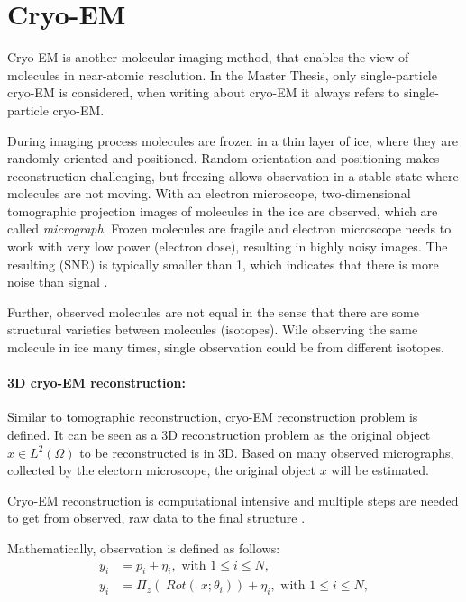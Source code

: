 \section{Cryo-EM}
Cryo-EM is another molecular imaging method, that enables the view of molecules in near-atomic resolution.
In the Master Thesis, only single-particle cryo-EM \cite{singleParticleCryoEm} is considered, 
when writing about cryo-EM it always refers to single-particle cryo-EM.

During imaging process molecules are frozen in a thin layer of ice, where they are randomly oriented and positioned. 
Random orientation and positioning makes reconstruction challenging, 
but freezing allows observation in a stable state where molecules are not moving.
With an electron microscope, two-dimensional tomographic projection images of molecules in the ice are observed,
which are called \textit{micrograph}. 
Frozen molecules are fragile and electron microscope needs to work with
very low power (electron dose), resulting in highly noisy images. The resulting (SNR)
is typically smaller than 1, which indicates that there is more noise than signal \cite{cryoEmMath2}.

Further, observed molecules are not equal in the sense that there are some structural varieties between
molecules (isotopes). Wile observing the same molecule in ice many times, single observation could be from different isotopes.

\paragraph{3D cryo-EM reconstruction:}
Similar to tomographic reconstruction, cryo-EM reconstruction problem \cite{cryoEmMath} is defined.
It can be seen as a 3D reconstruction problem as the original object $x \in L^2(\Omega)$ to be reconstructed is in 3D.
Based on many observed micrographs, collected by the electorn microscope, the original object $x$ will be estimated.

Cryo-EM reconstruction is computational intensive and multiple steps are needed to get from observed, raw data to the final structure \cite{singleParticleCryoEm}.

Mathematically, observation is defined as follows:
\begin{equation}
    \label{eq:cryoEmSimple}
    \begin{aligned}
        y_i &= p_i + \eta_i, \text{ with } 1 \leq i \leq N,\\
        y_i &= \Pi_z  (\; Rot (\;x; \theta_i )) + \eta_i, \text{ with } 1 \leq i \leq N,    
    \end{aligned}
\end{equation}

